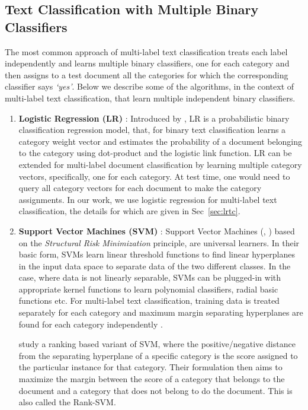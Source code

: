 \subsection{Text Classification with Multiple Binary Classifiers}
\label{sec:rw_multiple_classifiers}
The most common approach of multi-label text classification treats each label independently and learns multiple binary classifiers, one for each category and then assigns to a test document all the categories for which the corresponding classifier says \emph{`yes'}. Below we describe some of the algorithms, in the context of multi-label text classification, that learn multiple independent binary classifiers.
\begin{enumerate}
\item{\textbf{Logistic Regression (LR)} : }Introduced by \citep{hosmer1989applied}, LR is a probabilistic binary classification regression model, that, for binary text classification learns a category weight vector and estimates the probability of a document belonging to the category using dot-product and the logistic link function. LR can be extended for multi-label document classification by learning multiple category vectors, specifically, one for each category. At test time, one would need to query all category vectors for each document to make the category assignments. In our work, we use logistic regression for multi-label text classification, the details for which are given in Sec~\ref{sec:lrtc}.

\item{\textbf{Support Vector Machines (SVM)} : } Support Vector Machines (\citep{cortes1995support}, \citep{vapnik2000nature}) based on the \emph{Structural Risk Minimization} principle, are universal learners. In their basic form, SVMs learn linear threshold functions to find linear hyperplanes in the input data space to separate data of the two different classes. In the case, where data is not linearly separable, SVMs can be plugged-in with appropriate kernel functions to learn polynomial classifiers, radial basic functions etc. For multi-label text classification, training data is treated separately for each category and maximum margin separating hyperplanes are found for each category independently \citep{joachims1998text}.

\cite{elisseeff2001kernel} study a ranking based variant of SVM, where the positive/negative distance from the separating hyperplane of a specific category is the score assigned to the particular instance for that category. Their formulation then aims to maximize the margin between the score of a category that belongs to the document and a category that does not belong to do the document. This is also called the Rank-SVM.


\end{enumerate}
